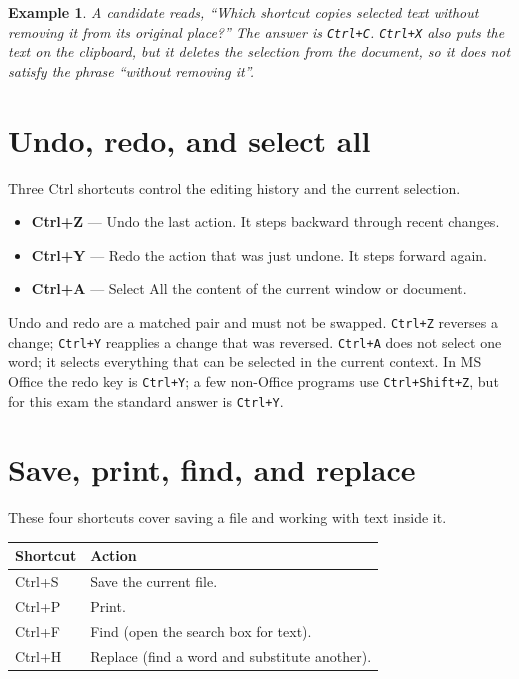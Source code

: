 \documentclass[11pt]{article}
\newtheorem{example}{Example}[section]
\begin{document}
\begin{example}
A candidate reads, ``Which shortcut copies selected text without removing it
from its original place?'' The answer is \texttt{Ctrl+C}. \texttt{Ctrl+X} also
puts the text on the clipboard, but it deletes the selection from the
document, so it does not satisfy the phrase ``without removing it''.
\end{example}

\section{Undo, redo, and select all}
Three Ctrl shortcuts control the editing history and the current selection.

\begin{itemize}
  \item \textbf{Ctrl+Z} --- Undo the last action. It steps backward through
    recent changes.
  \item \textbf{Ctrl+Y} --- Redo the action that was just undone. It steps
    forward again.
  \item \textbf{Ctrl+A} --- Select All the content of the current window or
    document.
\end{itemize}

Undo and redo are a matched pair and must not be swapped. \texttt{Ctrl+Z}
reverses a change; \texttt{Ctrl+Y} reapplies a change that was reversed.
\texttt{Ctrl+A} does not select one word; it selects everything that can be
selected in the current context. In MS Office the redo key is \texttt{Ctrl+Y};
a few non-Office programs use \texttt{Ctrl+Shift+Z}, but for this exam the
standard answer is \texttt{Ctrl+Y}.

\section{Save, print, find, and replace}
These four shortcuts cover saving a file and working with text inside it.

\begin{center}
\begin{tabular}{p{}p{}}
\toprule
\textbf{Shortcut} & \textbf{Action} \\
\midrule
Ctrl+S & Save the current file. \\
Ctrl+P & Print. \\
Ctrl+F & Find (open the search box for text). \\
Ctrl+H & Replace (find a word and substitute another). \\
\bottomrule
\end{tabular}
\end{center}
\end{document}
